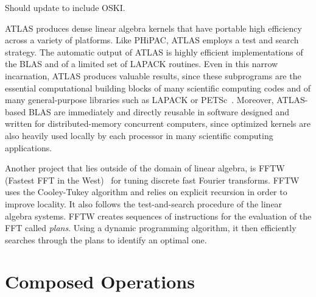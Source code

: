 \documentclass[11pt]{article}
\begin{document}
Should update to include OSKI.

ATLAS produces dense linear algebra kernels that have portable high efficiency across a variety of platforms. Like PHiPAC, ATLAS employs a test and search strategy. The automatic output of ATLAS is highly efficient implementations of the BLAS and of a limited set of LAPACK routines. Even in this narrow incarnation, ATLAS produces valuable results, since these subprograms are the essential computational building blocks of many scientific computing codes and of many general-purpose libraries such as LAPACK or PETSc~\cite{BGC+98}.  Moreover, ATLAS-based BLAS are immediately and directly reusable in software designed and written for distributed-memory concurrent computers, since optimized kernels are also heavily used locally by each processor in many scientific computing applications.

Another project that lies outside of the domain of linear algebra, is FFTW (Fastest FFT in the West)~\cite{frigo98, frigo99} for tuning discrete fast Fourier transforms.  FFTW uses the Cooley-Tukey algorithm and relies on explicit recursion in order to improve locality.   It also follows the test-and-search procedure of the linear algebra systems. FFTW creates sequences of instructions for the evaluation of the FFT called {\em plans}. Using a dynamic programming algorithm, it then efficiently searches through the plans to identify an optimal one.

\section{Composed Operations}
\label{sec:composed}

\end{document}
